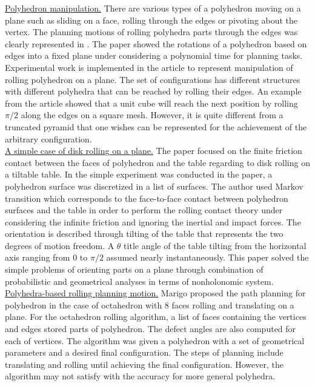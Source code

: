 \noindent\uline{Polyhedron manipulation.}
There are various types of a polyhedron moving on a plane such as sliding on a face, rolling through the edges or pivoting about the vertex. The planning motions of rolling polyhedra parts through the edges was clearly represented in \cite{Marigo97_PolyhedraManipulation_rolling}. The paper showed the rotations of a polyhedron based on edges into a fixed plane under considering a polynomial time for planning tasks. Experimental work is implemented in the article to represent manipulation of rolling polyhedron on a plane.
The set of configurations has different structures with different polyhedra that can be reached by rolling their edges. An example from the article showed that a unit cube will reach the next position by rolling $\pi/2$ along the edges on a square mesh. However, it is quite different from a truncated pyramid that one wishes can be represented for the achievement of the arbitrary configuration.\\

\noindent\uline{A simple case of disk rolling on a plane.}
The paper \cite{Erdmann91_polyhedronRolling_on_table} focused on the finite friction contact between the faces of polyhedron and the table regarding to disk rolling on a tiltable table. In the simple experiment was conducted in the paper, a polyhedron surface was discretized in a list of surfaces. The author used Markov transition which corresponds to the face-to-face contact between polyhedron surfaces and the table in order to perform the rolling contact theory under considering the infinite friction and ignoring the inertial and impact forces. The orientation is described through tilting of the table that represents the two degrees of motion freedom. A $\theta$ title angle of the table tilting from the horizontal axis ranging from $0$ to $\pi/2$ assumed nearly instantaneously. This paper solved the simple problems of orienting parts on a plane through combination of probabilistic and geometrical analyses in terms of nonholonomic system.\\


\noindent\uline{Polyhedra-based rolling planning motion.}
Marigo \cite{Marigo2000_Polyhedral} proposed the path planning for polyhedron in the case of octahedron with 8 faces rolling and translating on a plane.
For the octahedron rolling algorithm, a list of faces containing the vertices and edges stored parts of polyhedron. The defect angles are also computed for each of vertices. The algorithm was given a polyhedron with a set of geometrical parameters and a desired final configuration. The steps of planning include translating and rolling until achieving the final configuration. However, the algorithm may not satisfy with the accuracy for more general polyhedra.\\





